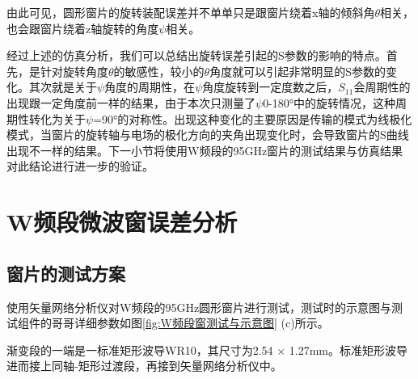 \documentclass[master]{thesis-uestc}
\begin{document}
由此可见，圆形窗片的旋转装配误差并不单单只是跟窗片绕着x轴的倾斜角$\theta$相关，也会跟窗片绕着z轴旋转的角度$\psi$相关。

经过上述的仿真分析，我们可以总结出旋转误差引起的S参数的影响的特点。首先，是针对旋转角度\(\theta\)的敏感性，较小的\(\theta\)角度就可以引起非常明显的S参数的变化。其次就是关于\(\psi\)角度的周期性，在\(\psi\)角度旋转到一定度数之后，\(S_{11}\)会周期性的出现跟一定角度前一样的结果，由于本次只测量了\(\psi\)0-180°中的旋转情况，这种周期性转化为关于\(\psi\)=90°的对称性。出现这种变化的主要原因是传输的模式为线极化模式，当窗片的旋转轴与电场的极化方向的夹角出现变化时，会导致窗片的S曲线出现不一样的结果。下一小节将使用W频段的95GHz窗片的测试结果与仿真结果对此结论进行进一步的验证。

\section{W频段微波窗误差分析}
\subsection{窗片的测试方案}
使用矢量网络分析仪对W频段的95GHz圆形窗片进行测试，测试时的示意图与测试组件的哥哥详细参数如图\ref{fig:W频段窗测试与示意图} (c)所示。

渐变段的一端是一标准矩形波导WR10，其尺寸为2.54 \(\times\) 1.27mm。标准矩形波导进而接上同轴-矩形过渡段，再接到矢量网络分析仪中。
\end{document}

